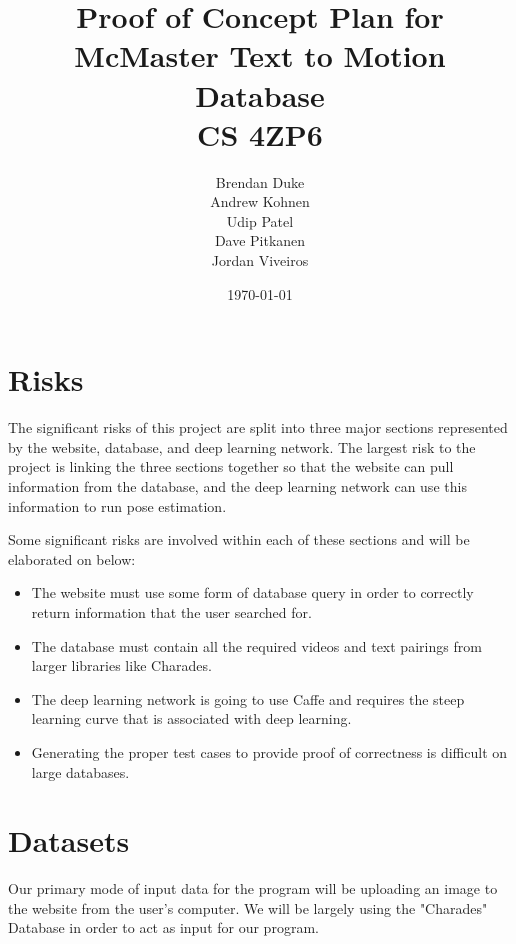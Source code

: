 \documentclass[a4paper, 12pt]{article}
\date{\today}
\title{Proof of Concept Plan for McMaster Text to Motion Database \\CS 4ZP6}
\author{Brendan Duke\\
        Andrew Kohnen\\
        Udip Patel\\
        Dave Pitkanen\\
        Jordan Viveiros}
\begin{document}
\maketitle

\section{Risks}
The significant risks of this project are split into three major sections
represented by the website, database, and deep learning network. The largest
risk to the project is linking the three sections together so that the website
can pull information from the database, and the deep learning network can use
this information to run pose estimation.

Some significant risks are involved within each of these sections and will be elaborated on below:

\begin{itemize}
    \item The website must use some form of database query in order to
            correctly return information that the user searched for.
    \item The database must contain all the required videos and text pairings
            from larger libraries like Charades.
    \item The deep learning network is going to use Caffe and requires the
            steep learning curve that is associated with deep learning.
    \item Generating the proper test cases to provide proof of correctness is
            difficult on large databases.
\end{itemize}

\section{Datasets}
{Our primary mode of input data for the program will be uploading an image to
the website from the user's computer. We will be largely using the "Charades"
Database in order to act as input for our program.}
\end{document}
